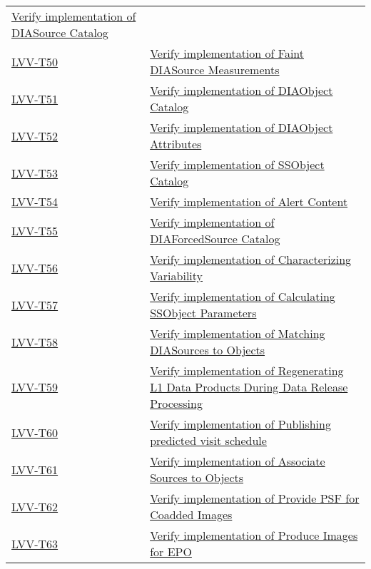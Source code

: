 \begin{longtable}[]{p{3cm}p{13cm}}
    \href{https://jira.lsstcorp.org/secure/Tests.jspa\#/testCase/LVV-T49}{Verify implementation of DIASource Catalog} \tabularnewline
    \hyperref[lvv-t50]{LVV-T50} &
    \href{https://jira.lsstcorp.org/secure/Tests.jspa\#/testCase/LVV-T50}{Verify implementation of Faint DIASource Measurements} \tabularnewline
    \hyperref[lvv-t51]{LVV-T51} &
    \href{https://jira.lsstcorp.org/secure/Tests.jspa\#/testCase/LVV-T51}{Verify implementation of DIAObject Catalog} \tabularnewline
    \hyperref[lvv-t52]{LVV-T52} &
    \href{https://jira.lsstcorp.org/secure/Tests.jspa\#/testCase/LVV-T52}{Verify implementation of DIAObject Attributes} \tabularnewline
    \hyperref[lvv-t53]{LVV-T53} &
    \href{https://jira.lsstcorp.org/secure/Tests.jspa\#/testCase/LVV-T53}{Verify implementation of SSObject Catalog} \tabularnewline
    \hyperref[lvv-t54]{LVV-T54} &
    \href{https://jira.lsstcorp.org/secure/Tests.jspa\#/testCase/LVV-T54}{Verify implementation of Alert Content} \tabularnewline
    \hyperref[lvv-t55]{LVV-T55} &
    \href{https://jira.lsstcorp.org/secure/Tests.jspa\#/testCase/LVV-T55}{Verify implementation of DIAForcedSource Catalog} \tabularnewline
    \hyperref[lvv-t56]{LVV-T56} &
    \href{https://jira.lsstcorp.org/secure/Tests.jspa\#/testCase/LVV-T56}{Verify implementation of Characterizing Variability} \tabularnewline
    \hyperref[lvv-t57]{LVV-T57} &
    \href{https://jira.lsstcorp.org/secure/Tests.jspa\#/testCase/LVV-T57}{Verify implementation of Calculating SSObject Parameters} \tabularnewline
    \hyperref[lvv-t58]{LVV-T58} &
    \href{https://jira.lsstcorp.org/secure/Tests.jspa\#/testCase/LVV-T58}{Verify implementation of Matching DIASources to Objects} \tabularnewline
    \hyperref[lvv-t59]{LVV-T59} &
    \href{https://jira.lsstcorp.org/secure/Tests.jspa\#/testCase/LVV-T59}{Verify implementation of Regenerating L1 Data Products During Data Release Processing} \tabularnewline
    \hyperref[lvv-t60]{LVV-T60} &
    \href{https://jira.lsstcorp.org/secure/Tests.jspa\#/testCase/LVV-T60}{Verify implementation of Publishing predicted visit schedule} \tabularnewline
    \hyperref[lvv-t61]{LVV-T61} &
    \href{https://jira.lsstcorp.org/secure/Tests.jspa\#/testCase/LVV-T61}{Verify implementation of Associate Sources to Objects} \tabularnewline
    \hyperref[lvv-t62]{LVV-T62} &
    \href{https://jira.lsstcorp.org/secure/Tests.jspa\#/testCase/LVV-T62}{Verify implementation of Provide PSF for Coadded Images} \tabularnewline
    \hyperref[lvv-t63]{LVV-T63} &
    \href{https://jira.lsstcorp.org/secure/Tests.jspa\#/testCase/LVV-T63}{Verify implementation of Produce Images for EPO} \tabularnewline

\end{longtable}

